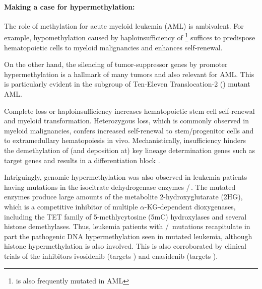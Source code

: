\paragraph{Making a case for hypermethylation:} The role of methylation for acute myeloid leukemia (AML) is ambivalent. For example, hypomethylation caused by haploinsufficiency of \footnote{ is also frequently mutated in AML\cite{Eriksson2015,Rau2016}} suffices to predispose hematopoietic cells to myeloid malignancies\cite{Cole2017} and enhances self-renewal\cite{Challen2014}. 

On the other hand, the silencing of tumor-suppressor genes by promoter hypermethylation is a hallmark of many tumors and also relevant for AML\cite{Sonnet2014}. This is particularly evident in the subgroup of Ten-Eleven Translocation-2 () mutant AML.

Complete  loss or haploinsufficiency increases hematopoietic stem cell self-renewal and myeloid transformation\cite{Moran-Crusio2011}. Heterozygous loss, which is commonly observed in myeloid malignancies, confers increased self-renewal to stem/progenitor cells and to extramedullary hematopoiesis in vivo\cite{Moran-Crusio2011}.  Mechanistically,  insufficiency hinders the demethylation of (and \hisfourthree deposition at) key lineage determination genes such as  target genes\cite{Rica2013} and results in a differentiation block . 

Intriguingly, genomic hypermethylation was also observed in leukemia patients having mutations in the isocitrate dehydrogenase enzymes /$\,$\cite{Im2014}. The mutated enzymes produce large amounts of the metabolite 2-hydroxyglutarate (2HG)\cite{Dang2009}, which is a competitive inhibitor of multiple $\alpha$-KG-dependent dioxygenases, including the TET family of 5-methlycytosine (5mC) hydroxylases and several histone demethylases\cite{Xu2011a}. Thus, leukemia patients with /$\,$ mutations recapitulate in part the pathogenic DNA hypermethylation seen in  mutated leukemia, although histone hypermethylation is also involved\cite{Kernytsky2015}. This is also corroborated by clinical trials of the inhibitors ivosidenib (targets ) and enasidenib (targets )\cite{Stone2017}.

